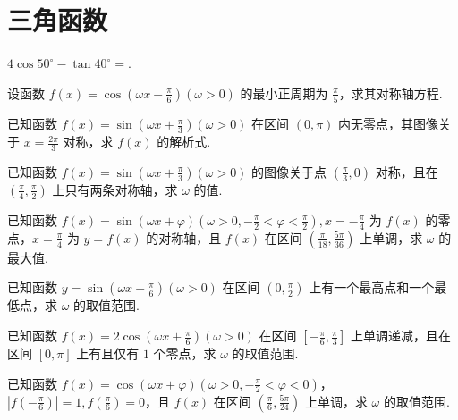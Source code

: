 \documentclass[a4paper , final]{ctexart}
\newenvironment{problem}[1]{%
  \item #1
  \par
  \vspace{8cm}
}{}
\begin{document}
\newpage
\section*{三角函数}

\begin{problems}
    \begin{problem}
        {
            $4\cos{50^\circ}-\tan{40^\circ}=$\underline{\hspace{1.5cm}}.
        }
    \end{problem}

    \begin{problem}
        {
            设函数 $f(x) = \cos(\omega x -\frac{\pi}{6})(\omega > 0)$ 的最小正周期为 $\frac{\pi}{5}$，求其对称轴方程.
        }
    \end{problem}

    \begin{problem}
        {
            已知函数 $f(x) = \sin(\omega x +\frac{\pi}{3})(\omega > 0)$ 在区间 $(0,\pi)$ 内无零点，其图像关于 $x=\frac{2\pi}{3}$ 对称，求 $f(x)$ 的解析式.
        }
    \end{problem}

    \begin{problem}
        {
            已知函数 $f(x) = \sin(\omega x +\frac{\pi}{3})(\omega > 0)$ 的图像关于点 $(\frac{\pi}{3},0)$ 对称，且在 $(\frac{\pi}{4},\frac{\pi}{2})$ 上只有两条对称轴，求 $\omega$ 的值.
        }
    \end{problem}
    
    \begin{problem}
        {
            已知函数 $f(x) = \sin(\omega x +\varphi)(\omega > 0,-\frac{\pi}{2}<\varphi<\frac{\pi}{2}),x=-\frac{\pi}   {4}$ 为 $f(x)$ 的零点，$x=\frac{\pi}{4}$ 为 $y=f(x)$ 的对称轴，且 $f(x)$ 在区间 $\left(\frac{\pi}  {18},\frac{5\pi}{36}\right)$ 上单调，求 $\omega$ 的最大值.
        }
    \end{problem}

    \begin{problem}
        {
            已知函数 $y = \sin(\omega x +\frac{\pi}{6})(\omega > 0)$ 在区间 $(0,\frac{\pi}{2})$ 上有一个最高点和一个最低点，求 $\omega$ 的取值范围.
        }
    \end{problem}
    
    \begin{problem}
        {
            已知函数 $f(x) = 2\cos(\omega x +\frac{\pi}{6})(\omega > 0)$ 在区间 $[-\frac{\pi}{6},\frac{\pi}{3}]$ 上单调递减，且在区间 $[0,\pi]$ 上有且仅有 $1$ 个零点，求 $\omega$ 的取值范围.
        }
    \end{problem}

    \begin{problem}
        {
            已知函数 $f(x) = \cos(\omega x +\varphi)(\omega > 0,-\frac{\pi}{2}<\varphi<0)$，$\left\vert f(-\frac{\pi}{6})\right\vert=1,f(\frac{\pi}{6})=0$，且 $f(x)$ 在区间 $\left(\frac{\pi}{6},\frac{5\pi}{24}\right)$ 上单调，求 $\omega$ 的取值范围.
        }
    \end{problem}
\end{problems}
\end{document}
